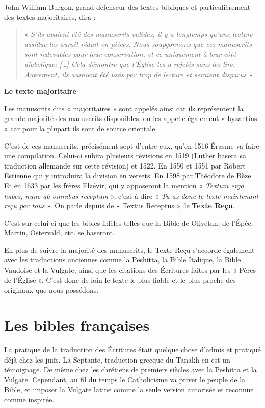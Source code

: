\begin{small}
John William Burgon, grand défenseur des textes bibliques et particulièrement des textes majoritaires, dira :
\begin{quote}
« \emph{S’ils avaient été des manuscrits valides, il y a longtemps qu’une lecture assidue les aurait réduit en pièces. Nous soupçonnons que ces manuscrits sont redevables pour leur conservation, et ce uniquement à leur côté diabolique; […] Cela démontre que l’Église les a rejetés sans les lire. Autrement, ils auraient été usés par trop de lecture et seraient disparus} »\newline
\end{quote}

\textbf{Le texte majoritaire}\bigskip

Les manuscrits dits « majoritaires » sont appelés ainsi car ils représentent la grande majorité des manuscrits disponibles, on les appelle également « byzantins » car pour la plupart ils sont de source orientale.\bigskip

C'est de ces manuscrits, précisément sept d'entre eux, qu'en 1516 Érasme va faire une compilation. Celui-ci subira plusieurs révisions en 1519 (Luther basera sa traduction allemande sur cette révision) et 1522. En 1550 et 1551 par Robert Estienne qui y introduira la division en versets. En 1598 par Théodore de Bèze. Et en 1633 par les frères Elzévir, qui y apposeront la mention « \emph{Textum ergo habes, nunc ab omnibus receptum} », c'est à dire « \emph{Tu as donc le texte maintenant reçu par tous} ». On parle depuis de « Textus Receptus », le \textbf{Texte Reçu}.\bigskip

C'est sur celui-ci que les bibles fidèles telles que la Bible de Olivétan, de l'Épée, Martin, Ostervald, etc. se baseront.\bigskip

En plus de suivre la majorité des manuscrits, le Texte Reçu s'accorde également avec les traductions anciennes comme la Peshitta, la Bible Italique, la Bible Vaudoise et la Vulgate, ainsi que les citations des Écritures faites par les « Pères de l'Église ». C'est donc de loin le texte le plus fiable et le plus proche des originaux que nous possédons.

\section*{Les bibles françaises}

La pratique de la traduction des Écritures était quelque chose d'admis et pratiqué déjà chez les juifs. La Septante, traduction grecque du Tanakh en est un témoignage. De même chez les chrétiens de premiers siècles avec la Peshitta et la Vulgate. Cependant, au fil du temps le Catholicisme va priver le peuple de la Bible, et imposer la Vulgate latine comme la seule version autorisée et reconnue comme inspirée.\bigskip


\end{small}
